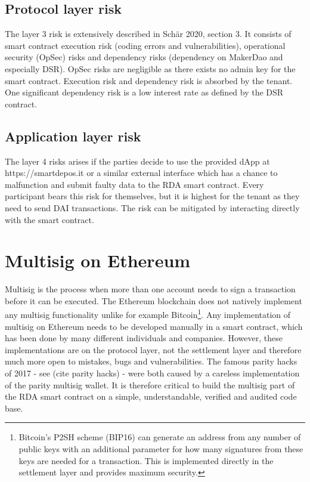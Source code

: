 \documentclass[12pt,a4paper,titlepage,oneside,english]{article}
\begin{document}
\subsection{Protocol layer risk}
The layer 3 risk is extensively described in Schär 2020, section 3. It consists of smart contract execution risk (coding errors and vulnerabilities), operational security (OpSec) risks and dependency risks (dependency on MakerDao and especially DSR). 
OpSec risks are negligible as there exists no admin key for the smart contract. Execution risk and dependency risk is absorbed by the tenant. One significant dependency risk is a low interest rate as defined by the DSR contract.

\subsection{Application layer risk}
The layer 4 risks arises if the parties decide to use the provided dApp at https://smartdepos.it or a similar external interface which has a chance to malfunction and submit faulty data to the RDA smart contract. Every participant bears this risk for themselves, but it is highest for the tenant as they need to send DAI transactions. The risk can be mitigated by interacting directly with the smart contract.



\section{Multisig on Ethereum}
Multisig is the process when more than one account needs to sign a transaction before it can be executed. The Ethereum blockchain does not natively implement any multisig functionality unlike for example Bitcoin\footnote{Bitcoin's P2SH scheme (BIP16) can generate an address from any number of public keys with an additional parameter for how many signatures from these keys are needed for a transaction. This is implemented directly in the settlement layer and provides maximum security.}. Any implementation of multisig on Ethereum needs to be developed manually in a smart contract, which has been done by many different individuals and companies. However, these implementations are on the protocol layer, not the settlement layer and therefore much more open to mistakes, bugs and vulnerabilities. The famous parity hacks of 2017 - see (cite parity hacks) - were both caused by a careless implementation of the parity multisig wallet. It is therefore critical to build the multisig part of the RDA smart contract on a simple, understandable, verified and audited code base.
\end{document}
